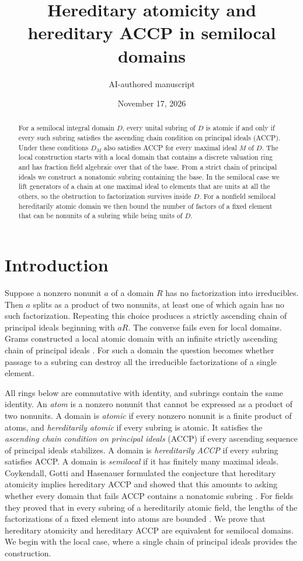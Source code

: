 \documentclass[11pt, letterpaper]{article}
\title{Hereditary atomicity and hereditary ACCP in semilocal domains}
\author{AI-authored manuscript}
\date{November 17, 2026}
\theoremstyle{definition}
\theoremstyle{remark}
\begin{document}
\maketitle

\begin{abstract}
    For a semilocal integral domain $D$, every unital subring of $D$ is atomic if and only if every such subring satisfies the ascending chain condition on principal ideals (ACCP).
    Under these conditions $D_M$ also satisfies ACCP for every maximal ideal $M$ of $D$.
    The local construction starts with a local domain that contains a discrete valuation ring and has fraction field algebraic over that of the base.
    From a strict chain of principal ideals we construct a nonatomic subring containing the base.
    In the semilocal case we lift generators of a chain at one maximal ideal to elements that are units at all the others, so the obstruction to factorization survives inside $D$.
    For a nonfield semilocal hereditarily atomic domain we then bound the number of factors of a fixed element that can be nonunits of a subring while being units of $D$.
\end{abstract}

\section{Introduction}
\label{sec:intro}

Suppose a nonzero nonunit $a$ of a domain $R$ has no factorization into irreducibles.
Then $a$ splits as a product of two nonunits, at least one of which again has no such factorization.
Repeating this choice produces a strictly ascending chain of principal ideals beginning with $aR$.
The converse fails even for local domains.
Grams constructed a local atomic domain with an infinite strictly ascending chain of principal ideals \cite[Theorem~1.3]{Grams}.
For such a domain the question becomes whether passage to a subring can destroy all the irreducible factorizations of a single element.

All rings below are commutative with identity, and subrings contain the same identity.
An \emph{atom} is a nonzero nonunit that cannot be expressed as a product of two nonunits.
A domain is \emph{atomic} if every nonzero nonunit is a finite product of atoms, and \emph{hereditarily atomic} if every subring is atomic.
It satisfies the \emph{ascending chain condition on principal ideals} (ACCP) if every ascending sequence of principal ideals stabilizes.
A domain is \emph{hereditarily ACCP} if every subring satisfies ACCP.
A domain is \emph{semilocal} if it has finitely many maximal ideals.
Coykendall, Gotti and Hasenauer formulated the conjecture that hereditary atomicity implies hereditary ACCP and showed that this amounts to asking whether every domain that fails ACCP contains a nonatomic subring \cite[Conjecture~6.1 and Proposition~6.2]{CGH}.
For fields they proved that in every subring of a hereditarily atomic field, the lengths of the factorizations of a fixed element into atoms are bounded \cite[Corollary~4.5]{CGH}.
We prove that hereditary atomicity and hereditary ACCP are equivalent for semilocal domains.
We begin with the local case, where a single chain of principal ideals provides the construction.
\end{document}
